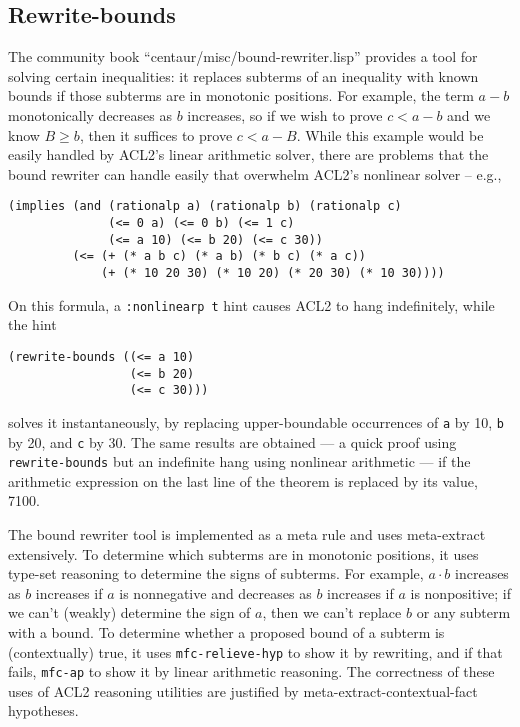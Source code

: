 \subsection{Rewrite-bounds}

The community book ``centaur/misc/bound-rewriter.lisp'' provides a
tool for solving certain inequalities: it replaces subterms of an
inequality with known bounds if those subterms are in monotonic
positions.  For example, the term $a-b$ monotonically decreases as $b$
increases, so if we wish to prove $c<a-b$ and we know $B \geq b$, then
it suffices to prove $c<a-B$.  While this example would be easily
handled by ACL2's linear arithmetic solver, there are problems that
the bound rewriter can handle easily that overwhelm ACL2's nonlinear
solver -- e.g.,
\begin{verbatim}
(implies (and (rationalp a) (rationalp b) (rationalp c)
              (<= 0 a) (<= 0 b) (<= 1 c)
              (<= a 10) (<= b 20) (<= c 30))
         (<= (+ (* a b c) (* a b) (* b c) (* a c))
             (+ (* 10 20 30) (* 10 20) (* 20 30) (* 10 30))))
\end{verbatim}
On this formula, a \texttt{:nonlinearp t} hint causes ACL2 to hang indefinitely, while the hint
\begin{verbatim}
(rewrite-bounds ((<= a 10)
                 (<= b 20)
                 (<= c 30)))
\end{verbatim}
solves it instantaneously, by replacing upper-boundable occurrences of
\texttt{a} by 10, \texttt{b} by 20, and \texttt{c} by 30.  The same
results are obtained --- a quick proof using {\tt rewrite-bounds} but
an indefinite hang using nonlinear arithmetic --- if the arithmetic
expression on the last line of the theorem is replaced by its value,
7100.

The bound rewriter tool is implemented as a meta rule and uses
meta-extract extensively.  To determine which subterms are in
monotonic positions, it uses type-set reasoning to determine the signs
of subterms.  For example, $a \cdot b$ increases as $b$ increases if
$a$ is nonnegative and decreases as $b$ increases if $a$ is
nonpositive; if we can't (weakly) determine the sign of $a$, then we
can't replace $b$ or any subterm with a bound.  To determine whether a
proposed bound of a subterm is (contextually) true, it uses
\texttt{mfc-relieve-hyp} to show it by rewriting, and if that fails,
\texttt{mfc-ap} to show it by linear arithmetic reasoning.  The
correctness of these uses of ACL2 reasoning utilities are justified by
meta-extract-contextual-fact hypotheses.

